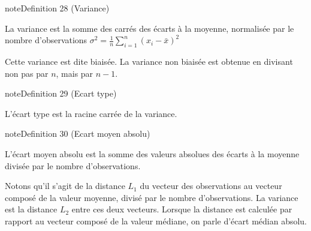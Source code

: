 \documentclass[letterpaper,10pt,french]{sphinxmanual}
\begin{document}
\label{statsdescriptives:definition-12}
\begin{sphinxadmonition}{note}{Definition 28 (Variance)}



\sphinxAtStartPar
La variance est la somme des carrés des écarts à la moyenne, normalisée par le nombre d’observations
\(\sigma^2 = \frac{1}{n}\displaystyle\sum_{i=1}^n\left (x_i-\bar{x}\right )^2\)
\end{sphinxadmonition}

\sphinxAtStartPar
Cette variance est dite biaisée. La variance non biaisée est obtenue en divisant non pas par \(n\), mais par \(n-1\).
\label{statsdescriptives:definition-13}
\begin{sphinxadmonition}{note}{Definition 29 (Ecart type)}



\sphinxAtStartPar
L’écart type est la racine carrée de la variance.
\end{sphinxadmonition}
\label{statsdescriptives:definition-14}
\begin{sphinxadmonition}{note}{Definition 30 (Ecart moyen absolu)}



\sphinxAtStartPar
L’écart moyen absolu est la somme des valeurs absolues des écarts à la moyenne divisée par le nombre d’observations.
\end{sphinxadmonition}

\sphinxAtStartPar
Notons qu’il s’agit de la distance \(L_1\) du vecteur des observations au vecteur composé de la valeur moyenne, divisé par le nombre d’observations. La variance est la distance \(L_2\) entre ces deux vecteurs. Lorsque la distance est calculée par rapport au vecteur composé de la valeur médiane, on parle d’écart médian absolu.

\sphinxAtStartPar
{}
\end{document}
